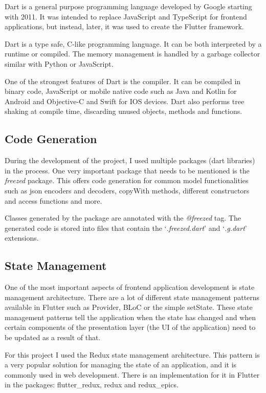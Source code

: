 \documentclass[a4paper,12pt]{report}
\begin{document}
Dart\cite{dartDocs} is a general purpose programming language developed by
Google starting with 2011. It was intended to replace JavaScript and TypeScript
for frontend applications, but instead, later, it was used to create the
Flutter framework.

Dart is a type safe, C-like programming language. It can be both interpreted by
a runtime or compiled. The memory management is handled by a garbage collector
similar with Python or JavaScript.

One of the strongest features of Dart is the compiler. It can be compiled in
binary code, JavaScript or mobile native code such as Java and Kotlin for
Android and Objective-C and Swift for IOS devices. Dart also performs tree
shaking at compile time, discarding unused objects, methods and functions.

\subsection{Code Generation}

During the development of the project, I used multiple packages (dart
libraries) in the process. One very important package that needs to be
mentioned is the \textit{freezed} package\cite{freezedDocs}. This offers code
generation for common model functionalities such as json encoders and decoders,
copyWith methods, different constructors and access functions and more.

Classes generated by the package are annotated with the \textit{@freezed} tag.
The generated code is stored into files that contain the
`\textit{.freezed.dart}' and `\textit{.g.dart}' extensions.

\subsection{State Management}

One of the most important aspects of frontend application development is state
management architecture. There are a lot of different state management patterns
available in Flutter\cite{flutterStateManagement} such as Provider, BLoC or the
simple setState. These state management patterns tell the application when the
state has changed and when certain components of the presentation layer (the UI
of the application) need to be updated as a result of that.

For this project I used the Redux state management architecture. This pattern
is a very popular solution for managing the state of an application, and it is
commonly used in web development. There is an implementation for it in Flutter
in the packages: flutter\_redux\cite{flutterReduxDocs}, redux\cite{reduxDocs}
and redux\_epics\cite{reduxEpicsDocs}.
\end{document}
